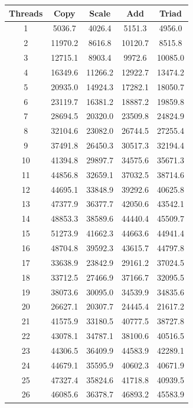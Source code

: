 \documentclass[12pt,a4paper,USenglish]{article}      %
\begin{document}
\begin{table}[!hbtp]
\centering
\begin{tabular}{ |c|c|c|c|c| } 
\hline
Threads & Copy & Scale & Add & Triad \\
\hline
1 & 5036.7 & 4026.4 & 5151.3 & 4956.0 \\
\hline
2 & 11970.2 & 8616.8 & 10120.7 & 8515.8 \\
\hline
3 & 12715.1 & 8903.4 & 9972.6 & 10085.0 \\
\hline
4 & 16349.6 & 11266.2 & 12922.7 & 13474.2 \\
\hline
5 & 20935.0 & 14924.3 & 17282.1 & 18050.7 \\
\hline
6 & 23119.7 & 16381.2 & 18887.2 & 19859.8 \\
\hline
7 & 28694.5 & 20320.0 & 23509.8 & 24824.9 \\
\hline
8 & 32104.6 & 23082.0 & 26744.5 & 27255.4 \\
\hline
9 & 37491.8 & 26450.3 & 30517.3 & 32194.4 \\
\hline
10 & 41394.8 & 29897.7 & 34575.6 & 35671.3 \\
\hline
11 & 44856.8 & 32659.1 & 37032.5 & 38714.6 \\
\hline
12 & 44695.1 & 33848.9 & 39292.6 & 40625.8 \\
\hline
13 & 47377.9 & 36377.7 & 42050.6 & 43542.1 \\
\hline
14 & 48853.3 & 38589.6 & 44440.4 & 45509.7 \\
\hline
15 & 51273.9 & 41662.3 & 44663.6 & 44941.4 \\
\hline
16 & 48704.8 & 39592.3 & 43615.7 & 44797.8 \\
\hline
17 & 33638.9 & 23842.9 & 29161.2 & 37024.5 \\
\hline
18 & 33712.5 & 27466.9 & 37166.7 & 32095.5 \\
\hline
19 & 38073.6 & 30095.0 & 34539.9 & 34835.6 \\
\hline
20 & 26627.1 & 20307.7 & 24445.4 & 21617.2 \\
\hline
21 & 41575.9 & 33180.5 & 40777.5 & 38727.8 \\
\hline
22 & 43078.1 & 34787.1 & 38100.6 & 40516.5 \\
\hline
23 & 44306.5 & 36409.9 & 44583.9 & 42289.1 \\
\hline
24 & 44679.1 & 35595.9 & 40602.3 & 40671.9 \\
\hline
25 & 47327.4 & 35824.6 & 41718.8 & 40939.5 \\
\hline
26 & 46085.6 & 36378.7 & 46893.2 & 45583.9 \\

\end{tabular}
\end{table}
\end{document}
